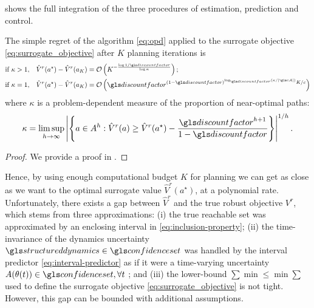  shows the full integration of the three procedures of estimation, prediction and control. 

\begin{theorem}
	\label{theorem:opd-regret}
	\begin{leftbar}[theorembar]
	The simple regret of the \OPD algorithm \eqref{eq:opd} applied to the surrogate objective \eqref{eq:surrogate_objective} after $K$ planning iterations is
	\begin{align*}
	\text{if } \kappa>1,\quad& 
	\hat{V}^r(a^{\star}) - \hat{V}^r({a_K}) = \cO\left(K^{-\frac{\log 1/\discount}{\log \kappa}}\right);\\
	\text{if }\kappa=1,\quad&
	\hat{V}^r(a^{\star}) - \hat{V}^r({a_K}) = \cO\left(\discount^{{(1-\discount)^{\log_\discount (\kappa/|\cA|)}}K/{c}}\right)
	\end{align*}
	where $\kappa$ is a problem-dependent measure of the proportion of near-optimal paths:
	\[
	\kappa = \limsup_{h\rightarrow\infty} \left|\left\{a\in A^h: \hat{V}^r(a)\geq \hat{V}^r(a^{\star}) - \frac{\discount^{h+1}}{1-\discount}\right\}\right|^{1/h}.
	\]
	\end{leftbar}
\end{theorem}
\begin{proof}
	We provide a proof in .
\end{proof}

Hence, by using enough computational budget $K$ for planning we can get as close as we want to the optimal surrogate value $\hat{V}^r(a^{\star})$, at a polynomial rate. Unfortunately, there exists a gap between $\hat{V}^r$ and the true robust objective $V^r$, which stems from three approximations: (i) the true reachable set was approximated by an enclosing interval in \eqref{eq:inclusion-property}; (ii) the time-invariance of the dynamics uncertainty $\structureddynamics\in\confidenceset$ was handled by the interval predictor \eqref{eq:interval-predictor} as if it were a time-varying uncertainty $A(\theta(t))\in\confidenceset,\forall t$ ; and (iii) the lower-bound $\sum\min\leq \min\sum$ used to define the surrogate objective \eqref{eq:surrogate_objective} is not tight. However, this gap can be bounded with additional assumptions.

